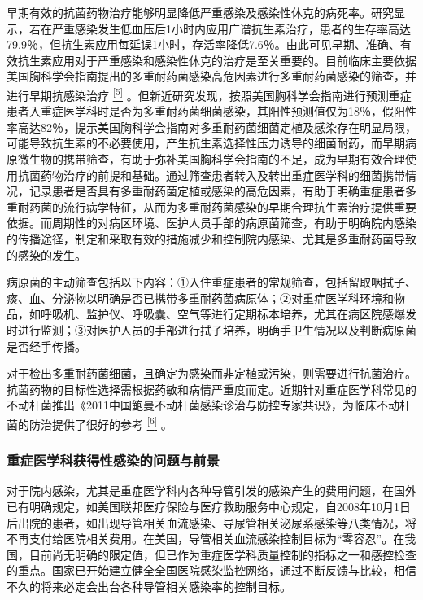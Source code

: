 早期有效的抗菌药物治疗能够明显降低严重感染及感染性休克的病死率。研究显示，若在严重感染发生低血压后1小时内应用广谱抗生素治疗，患者的生存率高达79.9％，但抗生素应用每延误1小时，存活率降低7.6％。由此可见早期、准确、有效抗生素应用对于严重感染和感染性休克的治疗是至关重要的。目前临床主要依据美国胸科学会指南提出的多重耐药菌感染高危因素进行多重耐药菌感染的筛查，并进行早期抗感染治疗
\protect\hyperlink{text00031.htmlux5cux23ch5-30}{\textsuperscript{{[}5{]}}}
。但新近研究发现，按照美国胸科学会指南进行预测重症患者入重症医学科时是否为多重耐药菌细菌感染，其阳性预测值仅为18％，假阳性率高达82％，提示美国胸科学会指南对多重耐药菌细菌定植及感染存在明显局限，可能导致抗生素的不必要使用，产生抗生素选择性压力诱导的细菌耐药，而早期病原微生物的携带筛查，有助于弥补美国胸科学会指南的不足，成为早期有效合理使用抗菌药物治疗的前提和基础。通过筛查患者转入及转出重症医学科的细菌携带情况，记录患者是否具有多重耐药菌定植或感染的高危因素，有助于明确重症患者多重耐药菌的流行病学特征，从而为多重耐药菌感染的早期合理抗生素治疗提供重要依据。而周期性的对病区环境、医护人员手部的病原菌筛查，有助于明确院内感染的传播途径，制定和采取有效的措施减少和控制院内感染、尤其是多重耐药菌导致的感染的发生。

病原菌的主动筛查包括以下内容：①入住重症患者的常规筛查，包括留取咽拭子、痰、血、分泌物以明确是否已携带多重耐药菌病原体；②对重症医学科环境和物品，如呼吸机、监护仪、呼吸囊、空气等进行定期标本培养，尤其在病区院感爆发时进行监测；③对医护人员的手部进行拭子培养，明确手卫生情况以及判断病原菌是否经手传播。

对于检出多重耐药菌细菌，且确定为感染而非定植或污染，则需要进行抗菌治疗。抗菌药物的目标性选择需根据药敏和病情严重度而定。近期针对重症医学科常见的不动杆菌推出《2011中国鲍曼不动杆菌感染诊治与防控专家共识》，为临床不动杆菌的防治提供了很好的参考
\protect\hyperlink{text00031.htmlux5cux23ch6-30}{\textsuperscript{{[}6{]}}}
。

\subsubsection{重症医学科获得性感染的问题与前景}

对于院内感染，尤其是重症医学科内各种导管引发的感染产生的费用问题，在国外已有明确规定，如美国联邦医疗保险与医疗救助服务中心规定，自2008年10月1日后出院的患者，如出现导管相关血流感染、导尿管相关泌尿系感染等八类情况，将不再支付给医院相关费用。在美国，导管相关血流感染控制目标为“零容忍”。在我国，目前尚无明确的限定值，但已作为重症医学科质量控制的指标之一和感控检查的重点。国家已开始建立健全全国医院感染监控网络，通过不断反馈与比较，相信不久的将来必定会出台各种导管相关感染率的控制目标。

